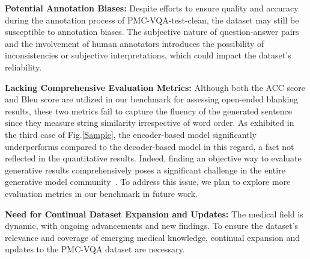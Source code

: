 \documentclass{article}
\begin{document}
\noindent \textbf{Potential Annotation Biases:} Despite efforts to ensure quality and accuracy during the annotation process of PMC-VQA-test-clean, the dataset may still be susceptible to annotation biases. The subjective nature of question-answer pairs and the involvement of human annotators introduces the possibility of inconsistencies or subjective interpretations, which could impact the dataset's reliability.

\noindent \textbf{Lacking Comprehensive Evaluation Metrics:} 
Although both the ACC score and Bleu score are utilized in our benchmark for assessing open-ended blanking results, these two metrics fail to capture the fluency of the generated sentence since they measure string similarity irrespective of word order. As exhibited in the third case of Fig.\ref{Sample}, the encoder-based model significantly underperforms compared to the decoder-based model in this regard, a fact not reflected in the quantitative results. Indeed, finding an objective way to evaluate generative results comprehensively poses a significant challenge in the entire generative model community~\cite{vicuna2023}. To address this issue, we plan to explore more evaluation metrics in our benchmark in future work.

\noindent  \textbf{Need for Continual Dataset Expansion and Updates:} The medical field is dynamic, with ongoing advancements and new findings. To ensure the dataset's relevance and coverage of emerging medical knowledge, continual expansion and updates to the PMC-VQA dataset are necessary.
 
\end{document}
